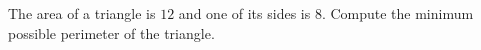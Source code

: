 The area of a triangle is $12$ and one of its sides is $8$. Compute the minimum possible perimeter of the triangle.
